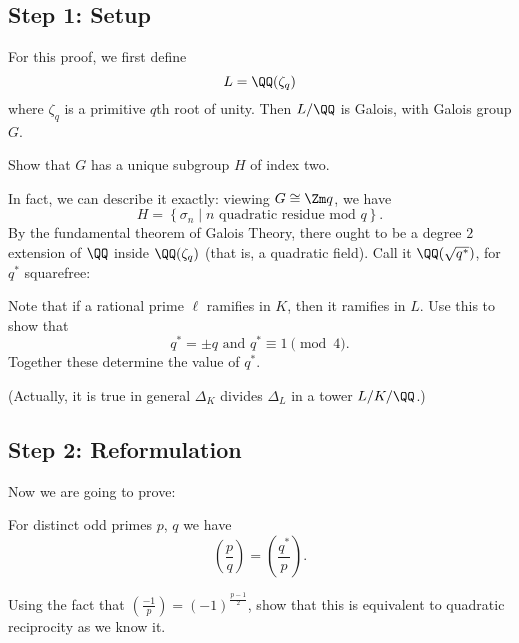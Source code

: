 \subsection{Step 1: Setup}
For this proof, we first define
\[ L = \QQ(\zeta_q) \]
where $\zeta_q$ is a primitive $q$th root of unity.
Then $L/\QQ$ is Galois, with Galois group $G$.
\begin{ques}
	Show that $G$ has a unique subgroup $H$ of index two.
\end{ques}
In fact, we can describe it exactly: viewing $G \cong \Zm q$, we have
\[ H = \left\{ \sigma_n \mid \text{$n$ quadratic residue mod $q$} \right\}. \]
By the fundamental theorem of Galois Theory, there ought to be a degree $2$
extension of $\QQ$ inside $\QQ(\zeta_q)$ (that is, a quadratic field).
Call it $\QQ(\sqrt{q^\ast})$, for $q^\ast$ squarefree:
\begin{center}
\end{center}
\begin{exercise}
	Note that if a rational prime $\ell$ ramifies in $K$,
	then it ramifies in $L$.
	Use this to show that
	\[ q^\ast = \pm q \text{ and } q^\ast \equiv 1 \pmod 4. \]
	Together these determine the value of $q^\ast$.
\end{exercise}
(Actually, it is true in general
$\Delta_K$ divides $\Delta_L$ in a tower $L/K/\QQ$.)

\subsection{Step 2: Reformulation}
Now we are going to prove:
\begin{theorem}
	For distinct odd primes $p$, $q$ we have
	\[ \left( \frac pq \right) = \left( \frac{q^\ast}{p} \right). \]
\end{theorem}
\begin{exercise}
	Using the fact that $\left( \frac{-1}{p} \right) = (-1)^{\frac{p-1}{2}}$,
	show that this is equivalent to quadratic reciprocity as we know it.
\end{exercise}

